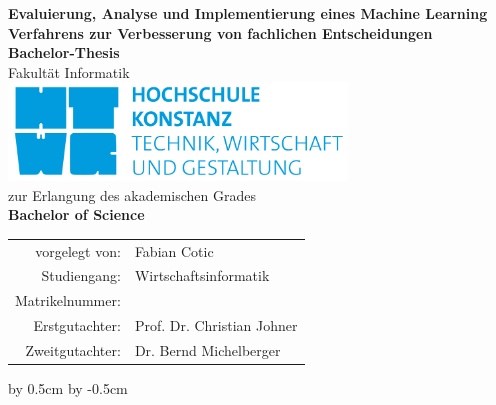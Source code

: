\thispagestyle{plain}
\begin{titlepage}

\begin{center}
\LARGE{\textbf{Evaluierung, Analyse und Implementierung eines Machine Learning Verfahrens zur Verbesserung von fachlichen Entscheidungen}}\\[3ex]

\Large{\textbf{Bachelor-Thesis}}\\[1ex]
\Large{Fakultät Informatik}\\[4ex]

\includegraphics[width=9cm]{images/htwgknold.png}\\[5ex]

\Large{zur Erlangung des akademischen Grades}\\[1ex]
\Large{\textbf{Bachelor of Science}}\\[3ex]

\normalsize
\begin{tabular}{rl}\\
	vorgelegt von: & \quad Fabian Cotic\\[1.2ex]
	Studiengang: & \quad Wirtschaftsinformatik\\[1.2ex]
	Matrikelnummer: & \quad 288710\\[1.2ex]
	Erstgutachter: & \quad Prof. Dr. Christian Johner\\[1.2ex]
	Zweitgutachter: & \quad Dr. Bernd Michelberger\\[3ex]
\end{tabular}

\end{center}

\end{titlepage}


\advance\oddsidemargin by 0.5cm %
\advance\evensidemargin by -0.5cm %
